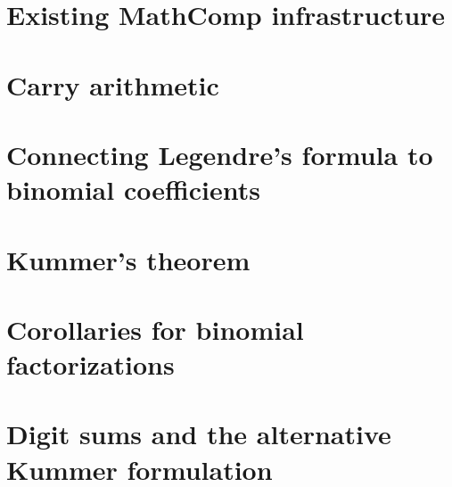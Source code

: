\chapter{Existing MathComp infrastructure}


\chapter{Carry arithmetic}


\chapter{Connecting Legendre's formula to binomial coefficients}


\chapter{Kummer's theorem}


\chapter{Corollaries for binomial factorizations}


\chapter{Digit sums and the alternative Kummer formulation}


